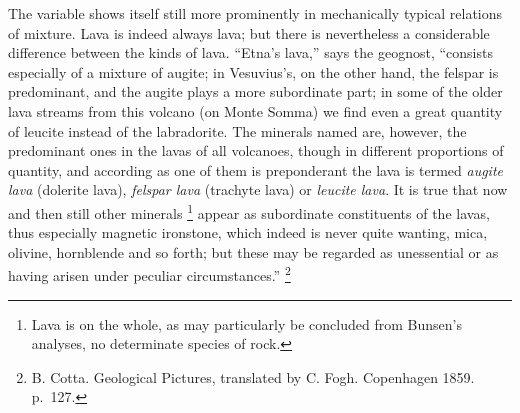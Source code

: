 \documentclass[12pt,a4paper]{book}
\renewcommand{\thefootnote}{*)}
\begin{document}
The variable shows itself still more prominently in mechanically typical relations of mixture. Lava is indeed always
lava; but there is nevertheless a considerable difference between the kinds of lava. ``Etna's lava,'' says the geognost,
``consists especially of a mixture of augite; in Vesuvius's, on the other hand, the felspar is predominant, and the
augite plays a more subordinate part; in some of the older lava streams from this volcano (on Monte Somma) we find even a
great quantity of leucite
instead of the labradorite. The minerals named are, however, the predominant ones in the lavas of all volcanoes, though
in different proportions of quantity, and according as one of them is preponderant the lava is termed
\emph{augite lava} (dolerite lava), \emph{felspar lava} (trachyte lava) or \emph{leucite lava}. It is true that now and
then still other minerals%
\footnote{%
Lava is on the whole, as may particularly be concluded from Bunsen's analyses, no determinate species of rock.}
appear as subordinate constituents of the lavas, thus especially magnetic ironstone, which indeed is never quite wanting,
mica, olivine, hornblende and so forth; but these may be regarded as unessential or as having arisen under peculiar
circumstances.''%
\renewcommand{\thefootnote}{**)}%
\footnote{%
B. Cotta. Geological Pictures, translated by C. Fogh. Copenhagen 1859. p.\ 127.}%
\renewcommand{\thefootnote}{*)}
\end{document}
